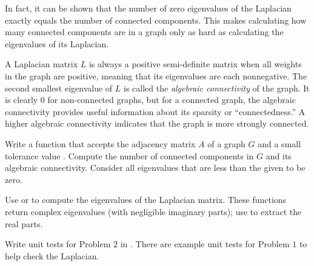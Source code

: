In fact, it can be shown that the number of zero eigenvalues of the Laplacian exactly equals the number of connected components.
This makes calculating how many connected components are in a graph only as hard as calculating the eigenvalues of its Laplacian.

A Laplacian matrix $L$ is always a positive semi-definite matrix when all weights in the graph are positive, meaning that its eigenvalues are each nonnegative.
The second smallest eigenvalue of $L$ is called the \emph{algebraic connectivity} of the graph.
It is clearly $0$ for non-connected graphs, but for a connected graph, the algebraic connectivity provides useful information about its sparsity or ``connectedness.''
A higher algebraic connectivity indicates that the graph is more strongly connected.

\begin{problem}
Write a function that accepts the adjacency matrix $A$ of a graph $G$ and a small tolerance value .
Compute the number of connected components in $G$ and its algebraic connectivity.
Consider all eigenvalues that are less than the given  to be zero.

Use  or  to compute the eigenvalues of the Laplacian matrix.
These functions return complex eigenvalues (with negligible imaginary parts); use  to extract the real parts.
\end{problem}

\begin{unittest}
Write unit tests for Problem $2$ in . There are example unit tests for Problem $1$ to help check the Laplacian.
\end{unittest}

\begin{comment} %
\begin{problem}
The folowing function creates a random symmetric matrix of Boolean values with sparsity determined by the input \li{c}.
\begin{lstlisting}
def sparse_generator(n, c):
    """Return a symmetric nxn matrix with sparsity determined by c."""
    A = np.random.rand(n**2).reshape((n, n))
    A = ( A > c**(.5) )
    return A.T @ A
\end{lstlisting}

Test your function from the previous problem on matrices created by \li{sparse_generator()} with inputs $n = 10, 100$ and $c = .25, .5, .95$.
What do you notice about the likelihood that a random graph is connected?
\end{problem}
\end{comment}

